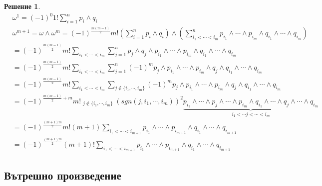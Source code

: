 \documentclass[12pt]{article}
\newtheorem*{solution*}{Решение}
\begin{document}
\begin{large}
\begin{solution*}
\begin{align*}
&\omega^1 =  (-1)^0 1! \sum_{i=1}^n p_i \wedge q_i \\
&\omega^{m+1} = \omega \wedge \omega^m = (-1)^{\frac{m(m-1)}{2}} m! (\sum_{i=1}^n p_i \wedge q_i) \wedge (\sum_{i_1<\cdots<i_m}^n p_{i_1} \wedge \cdots  \wedge p_{i_m} \wedge q_{i_1} \wedge \cdots \wedge q_{i_m}) \\
&=(-1)^{\frac{m(m-1)}{2}}m! \sum_{i_1<\cdots<i_m} \sum_{j=1}^n p_j \wedge q_j \wedge p_{i_1} \wedge \cdots  \wedge p_{i_m} \wedge q_{i_1} \wedge \cdots \wedge q_{i_m} \\
&=(-1)^{\frac{m(m-1)}{2}}m! \sum_{i_1<\cdots<i_m} \sum_{j=1}^n (-1)^{m}  p_j  \wedge p_{i_1} \wedge \cdots \wedge p_{i_m} \wedge q_j \wedge q_{i_1} \wedge \cdots \wedge q_{i_m} \\
&=(-1)^{\frac{m(m-1)}{2}}m! \sum_{i_1<\cdots<i_m} \sum_{j \not \in \{i_1,\cdots, i_m\}} (-1)^{m}  p_j  \wedge p_{i_1} \wedge \cdots \wedge p_{i_m} \wedge q_j \wedge q_{i_1} \wedge \cdots \wedge q_{i_m} \\
&=(-1)^{\frac{m(m-1)}{2}+m}m! \mathop{\sum_{i_1<\cdots<i_m}}_{j \not \in \{i_1,\cdots, i_m\}} (sgn(j,i_1,\cdots,i_m))^2  \underbrace{p_{i_1} \wedge \cdots \wedge p_j  \wedge \cdots \wedge p_{i_m} \wedge q_{i_1} \wedge \cdots \wedge q_j  \wedge  \cdots \wedge q_{i_m}}_{i_1<\cdots j < \cdots < i_m} \\
&=(-1)^{\frac{(m+1)m}{2}}m!(m+1)\sum_{i_1<\cdots<i_{m+1}} p_{i_1} \wedge \cdots  \wedge p_{i_{m+1}} \wedge q_{i_1} \wedge \cdots \wedge q_{i_{m+1}} \\
&=(-1)^{\frac{(m+1)m}{2}}(m+1)!\sum_{i_1<\cdots<i_{m+1}} p_{i_1} \wedge \cdots  \wedge p_{i_{m+1}} \wedge q_{i_1} \wedge \cdots \wedge q_{i_{m+1}}
\end{align*}
\end{solution*}

\subsection{Вътрешно произведение}


\end{large}
\end{document}
